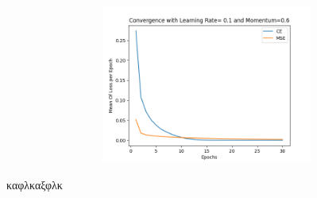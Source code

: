 \documentclass[12pt,a4paper]{article}
\begin{document}
        \begin{figure}[h]
            \raggedright
            \begin{subfigure}[t]{0.5\textwidth}
               \includegraphics[width=10cm,height=5.2cm,left]{images/0.1_0.6.png}
            \end{subfigure}
        \end{figure}
        καφλκαξφλκ
\end{document}
